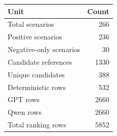 \begin{tabular}{lr}
\toprule
Unit & Count \\
\midrule
Total scenarios & 266 \\
Positive scenarios & 236 \\
Negative-only scenarios & 30 \\
Candidate references & 1330 \\
Unique candidates & 388 \\
Deterministic rows & 532 \\
GPT rows & 2660 \\
Qwen rows & 2660 \\
Total ranking rows & 5852 \\
\bottomrule
\end{tabular}

